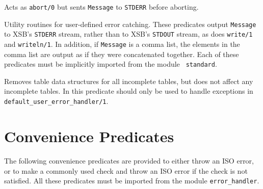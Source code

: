 \begin{description}
 
    Acts as {\tt abort/0} but sents {\tt Message} to {\tt STDERR}
    before aborting.

\vspace{-0.3in}

Utility routines for user-defined error catching.  These predicates
output {\tt Message} to XSB's {\tt STDERR} stream, rather than to
XSB's {\tt STDOUT} stream, as does {\tt write/1} and {\tt writeln/1}.
In addition, if {\tt Message} is a comma list, the elements in the
comma list are output as if they were concatenated together.  Each of
these predicates must be implicitly imported from the module {\tt
standard}.

%
Removes table data structures for all incomplete tables, but does not
affect any incomplete tables.  In \version{} this predicate should
only be used to handle exceptions in {\tt
default\_user\_error\_handler/1}.

\end{description}

\section{Convenience Predicates}

The following convenience predicates are provided to either throw an
ISO error, or to make a commonly used check and throw an ISO error if
the check is not satisfied.  All these predicates must be imported
from the module {\tt error\_handler}.

